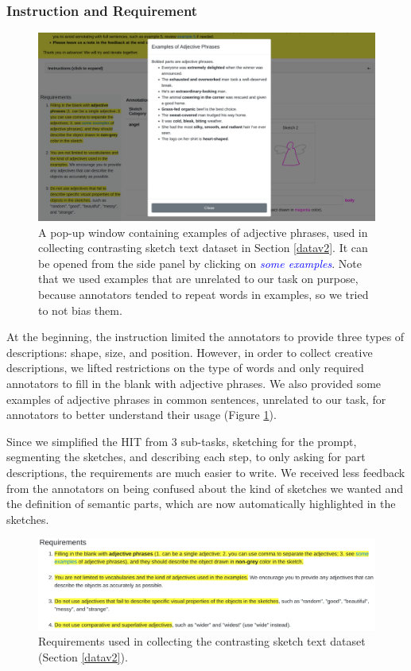 \subsubsection{Instruction and Requirement}

\begin{figure}[!h]
\centering
\includegraphics[width=\linewidth]{data_collection/version2/v2annoPop.png}  
\caption{A pop-up window containing examples of adjective phrases, used in collecting contrasting sketch text dataset in Section \ref{datav2}. It can be opened from the side panel by clicking on \textcolor{blue}{\it{some examples}}. Note that we used examples that are unrelated to our task on purpose, because annotators tended to repeat words in examples, so we tried to not bias them.}
\label{v2.adjective.phrases}
\end{figure}

At the beginning, the instruction limited the annotators to provide three types of descriptions: shape, size, and position. 
However, in order to collect creative descriptions, we lifted restrictions on the type of words and only required annotators to fill in the blank with adjective phrases. We also provided some examples of adjective phrases in common sentences, unrelated to our task, for annotators to better understand their usage (Figure \ref{v2.adjective.phrases}). 

Since we simplified the HIT from 3 sub-tasks, sketching for the prompt, segmenting the sketches, and describing each step, to only asking for part descriptions, the requirements are much easier to write. 
We received less feedback from the annotators on being confused about the kind of sketches we wanted and the definition of semantic parts, which are now automatically highlighted in the sketches.   

\begin{figure}[!h]
\centering
\includegraphics[width=\linewidth]{data_collection/version2/v2requirement.png}  
\caption{Requirements used in collecting the contrasting sketch text dataset (Section \ref{datav2}).}
\label{v2.requirement.1}
\end{figure}

